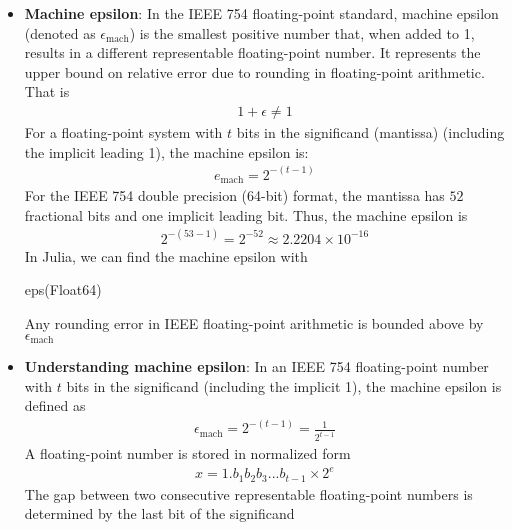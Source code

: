 \documentclass{report}
\begin{document}
\begin{itemize}
            \item \textbf{Machine epsilon}: In the IEEE 754 floating-point standard, machine epsilon (denoted as $\epsilon_{\text{mach}}$) is the smallest positive number that, when added to 1, results in a different representable floating-point number. It represents the upper bound on relative error due to rounding in floating-point arithmetic. That is
                \begin{align*}
                    1 + \epsilon \ne 1
                \end{align*}
                \bigbreak \noindent 
                For a floating-point system with $t$ bits in the significand (mantissa) (including the implicit leading 1), the machine epsilon is:
                \begin{align*}
                    e_{\text{mach}} = 2^{-(t-1)}
                \end{align*}
                For the IEEE 754 double precision (64-bit) format, the mantissa has $52$ fractional bits and one implicit leading bit. Thus, the machine epsilon is
                \begin{align*}
                    2^{-(53-1)} = 2^{-52} \approx 2.2204 \times 10^{-16}
                \end{align*}
                \bigbreak \noindent 
                In Julia, we can find the machine epsilon with
                \bigbreak \noindent 
                \begin{jlcode}
                eps(Float64)
                \end{jlcode}
                \bigbreak \noindent 
                Any rounding error in IEEE floating-point arithmetic is bounded above by $\epsilon_{\text{mach}} $
            \item \textbf{Understanding machine epsilon}:
                In an IEEE 754 floating-point number with $t$ bits in the significand (including the implicit 1), the machine epsilon is defined as
                \begin{align*}
                    \epsilon_{\text{mach}} = 2^{-(t-1)} = \frac{1}{2^{t-1}}
                \end{align*}
                A floating-point number is stored in normalized form
                \begin{align*}
                    x = 1.b_{1}b_{2}b_{3}...b_{t-1} \times 2^{e}
                \end{align*}
                The gap between two consecutive representable floating-point numbers is determined by the last bit of the significand

\end{itemize}
\end{document}
